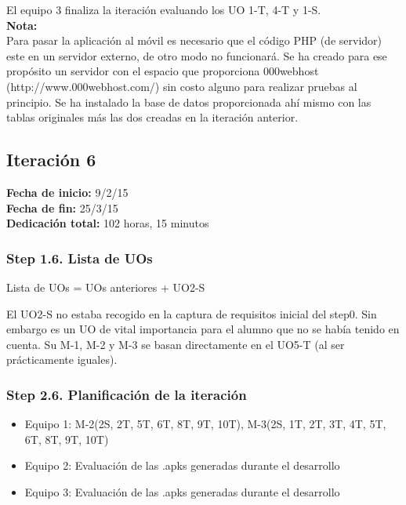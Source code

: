 El equipo 3 finaliza la iteración evaluando los UO 1-T, 4-T y 1-S.\\

\textbf{Nota:}\\

Para pasar la aplicación al móvil es necesario que el código PHP (de servidor) este en un servidor externo, de otro modo no funcionará. Se ha creado para ese propósito un servidor con el espacio que proporciona 000webhost (http://www.000webhost.com/) sin costo alguno para realizar pruebas al principio. Se ha instalado la base de datos proporcionada ahí mismo con las tablas originales más las dos creadas en la iteración anterior.\\


\subsection{Iteración 6}
\label{it6}

\begin{flushleft}
\textbf{Fecha de inicio:} 9/2/15\\
\textbf{Fecha de fin:} 25/3/15\\
\textbf{Dedicación total:} 102 horas, 15 minutos\\
\end{flushleft}

\subsubsection{Step 1.6. Lista de UOs}
\label{it6:1.6}

Lista de UOs = UOs anteriores + {UO2-S}

El UO2-S no estaba recogido en la captura de requisitos inicial del step0. Sin embargo es un UO de vital importancia para el alumno que no se había tenido en cuenta. Su M-1, M-2 y M-3 se basan directamente en el UO5-T (al ser prácticamente iguales).\\

\subsubsection{Step 2.6. Planificación de la iteración}
\label{it6:2.6}

\begin{itemize}
\item Equipo 1: M-2(2S, 2T, 5T, 6T, 8T, 9T, 10T), M-3(2S, 1T, 2T, 3T, 4T, 5T, 6T, 8T, 9T, 10T)
\item Equipo 2: Evaluación de las .apks generadas durante el desarrollo
\item Equipo 3: Evaluación de las .apks generadas durante el desarrollo
\end{itemize}

